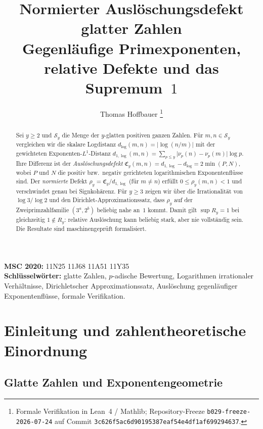 \documentclass[11pt,a4paper]{article}
\title{Normierter Ausl{\"o}schungsdefekt glatter Zahlen\\[0.35em]
	\large Gegenl{\"a}ufige Primexponenten, relative Defekte und das Supremum~$1$}
\author{Thomas Hoffbauer%
	\thanks{Formale Verifikation in Lean~4 / Mathlib; Repository-Freeze
		\texttt{b029-freeze-2026-07-24} auf Commit
		\texttt{3c626f5ac6d90195387eaf54e4df1af699294637}.}}
\date{}
\theoremstyle{definition}
\newcommand{\Sy}{\mathcal{S}_y}
\newcommand{\nuP}{\nu}
\newcommand{\dlog}{d_{\log}}
\newcommand{\dlogone}{d_{1,\log}}
\newcommand{\Cy}{\mathfrak{C}_y}
\newcommand{\rhoy}{\rho_y}
\newcommand{\Ry}{R_y}
\begin{document}
	\maketitle
	
	\begin{abstract}
		\noindent
		Sei $y\ge 2$ und $\Sy$ die Menge der $y$-glatten positiven ganzen Zahlen.
		F{\"u}r $m,n\in\Sy$ vergleichen wir die skalare Logdistanz
		$\dlog(m,n)=\lvert\log(n/m)\rvert$ mit der gewichteten Exponenten-$L^1$-Distanz
		$\dlogone(m,n)=\sum_{p\le y}\lvert\nuP_p(n)-\nuP_p(m)\rvert\log p$.
		Ihre Differenz ist der \emph{Ausl{\"o}schungsdefekt}
		$\Cy(m,n)=\dlogone-\dlog=2\min(P,N)$, wobei $P$ und $N$ die
		positiv bzw.\ negativ gerichteten logarithmischen Exponentenfl{\"u}sse sind.
		Der \emph{normierte} Defekt
		$\rhoy=\Cy/\dlogone$ (f{\"u}r $m\neq n$) erf{\"u}llt
		$0\le\rhoy(m,n)<1$ und verschwindet genau bei Signkoh{\"a}renz.
		F{\"u}r $y\ge 3$ zeigen wir {\"u}ber die Irrationalit{\"a}t von
		$\log 3/\log 2$ und den Dirichlet-Approximationssatz, dass
		$\rhoy$ auf der Zweiprimzahlfamilie $(3^a,2^b)$ beliebig nahe an~$1$ kommt.
		Damit gilt $\sup\Ry=1$ bei gleichzeitig $1\notin\Ry$: relative Ausl{\"o}schung
		kann beliebig stark, aber nie vollst{\"a}ndig sein.
		Die Resultate sind maschinengepr{\"u}ft formalisiert.
	\end{abstract}
	
	\noindent
	\textbf{MSC 2020:}
	11N25 %
	\quad
	11J68 %
	\quad
	11A51 %
	\quad
	11Y35 %
	\\
	\textbf{Schl{\"u}sselw{\"o}rter:}
	glatte Zahlen,
	$p$-adische Bewertung,
	Logarithmen irrationaler Verh{\"a}ltnisse,
	Dirichletscher Approximationssatz,
	Ausl{\"o}schung gegenl{\"a}ufiger Exponentenfl{\"u}sse,
	formale Verifikation.
	
	\tableofcontents
	
	\section{Einleitung und zahlentheoretische Einordnung}
	\label{sec:intro}
	
	\subsection{Glatte Zahlen und Exponentengeometrie}
	
\end{document}
